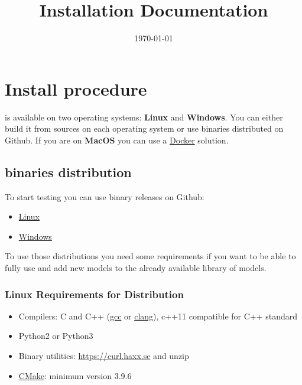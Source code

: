 \documentclass[a4paper, 12pt]{report}
\begin{document}
\title{\Dynawo Installation Documentation}
\date\today

\maketitle
\tableofcontents

\chapter{Install procedure}

\Dynawo is available on two operating systems: \textbf{Linux} and \textbf{Windows}.
You can either build it from sources on each operating system or use binaries distributed on Github.
If you are on \textbf{MacOS} you can use a \hyperref[sec:docker]{Docker} solution.

\section{\Dynawo binaries distribution}

To start testing \Dynawo you can use binary releases on Github:
\begin{itemize}
\item
  \href{https://github.com/dynawo/dynawo/releases/download/v1.5.0/Dynawo_Linux_v1.5.0.zip}{Linux}
\item
  \href{https://github.com/dynawo/dynawo/releases/download/v1.5.0/Dynawo_Windows_v1.5.0.zip}{Windows}
\end{itemize}

To use those distributions you need some requirements if you want to be able to fully use \Dynawo and add new models to the already available library of models.

\subsection{Linux Requirements for Distribution}

\begin{itemize}
\item Compilers: C and C++ (\href{https://www.gnu.org/software/gcc}{gcc} or \href{https://clang.llvm.org}{clang}), c++11 compatible for C++ standard
\item Python2 or Python3
\item Binary utilities: \href{curl}{https://curl.haxx.se} and unzip
\item \href{https://cmake.org/}{CMake}: minimum version 3.9.6
\end{itemize}
\end{document}
